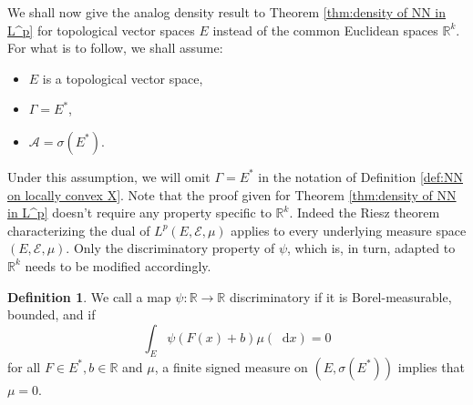 \documentclass[11pt,a4paper,twoside,openany]{report}
\numberwithin{equation}{section}
\newcommand{\diff}{\mathop{}\!\mathrm{d}}
\theoremstyle{plain} %
\theoremstyle{definition} %
\newtheorem{definition}[theorem]{Definition}
\theoremstyle{remark} %
\begin{document}
We shall now give the analog density result to Theorem \ref{thm:density of NN in L^p} for topological vector spaces \(E\) instead of the common Euclidean spaces \(\mathbb{R}^k\). For what is to follow, we shall assume:
\begin{itemize}
    \item \(E\) is a topological vector space,
    \item\(\Gamma = E^*\),
    \item\(\mathcal{A}=\sigma(E^*)\).
\end{itemize}
Under this assumption, we will omit \(\Gamma =E^*\) in the notation of Definition \ref{def:NN on locally convex X}.
Note that the proof given for Theorem \ref{thm:density of NN in L^p} doesn't require any property specific to \(\mathbb{R}^k\). Indeed the Riesz theorem characterizing the dual of \(L^p(E,\mathcal{E},\mu)\) applies to every underlying measure space \((E,\mathcal{E},\mu)\). Only the discriminatory property of \(\psi\), which is, in turn, adapted to \(\mathbb{R}^k\) needs to be modified accordingly.

\begin{definition}\label{def:discriminatory property of X}
 We call a map \(\psi:\mathbb{R}\to\mathbb{R}\) discriminatory if it is Borel-measurable, bounded, and if
    \begin{equation*}
        \int_{E}\psi(F(x)+b)\mu(\diff x)=0
    \end{equation*}
    for all \(F\in E^*,b\in\mathbb{R}\) and \(\mu\), a finite signed measure on \((E,\sigma(E^*))\) implies that \(\mu=0\).    
\end{definition}
\end{document}
